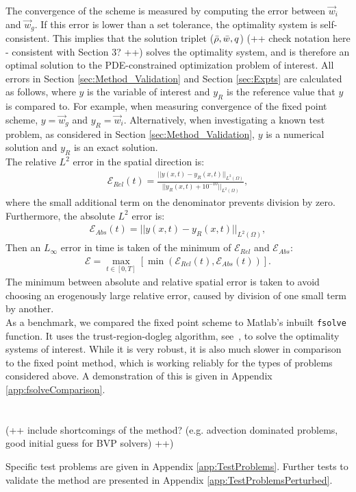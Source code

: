 The convergence of the scheme is measured by computing the error between $\vec{w}_{i}$ and $\vec{w}_{g}$. If this error is lower than a set tolerance, the optimality system is self-consistent. This implies that the solution triplet ($\bar{\rho},\bar{{w}},q$) (++ check notation here - consistent with Section 3? ++) solves the optimality system, and is therefore an optimal solution to the PDE-constrained optimization problem of interest.
All errors in Section \ref{sec:Method_Validation} and Section \ref{sec:Expts} are calculated as follows, where $y$ is the variable of interest and $y_R$ is the reference value that $y$ is compared to. For example, when measuring convergence of the fixed point scheme, $y = \vec{w}_g$ and $y_R = \vec{w}_i$. Alternatively, when investigating a known test problem, as considered in Section \ref{sec:Method_Validation}, $y$ is a numerical solution and $y_R$ is an exact solution.\\ 
The relative $L^2$ error in the spatial direction is:
\begin{align*}
\mathcal{E}_{Rel}(t) = \frac{|| y(x,t) - y_{R}(x,t)||_{L^2(\Omega)} }{||y_R(x,t) + 10^{-10}||_{L^2(\Omega)}},
\end{align*}
where the small additional term on the denominator prevents division by zero.
Furthermore, the absolute $L^2$ error is:
\begin{align*}
\mathcal{E}_{Abs}(t) = || y(x,t) - y_R(x,t)||_{L^2(\Omega)} ,
\end{align*}
Then an $L_\infty$ error in time is taken of the minimum of $\mathcal{E}_{Rel}$ and $\mathcal{E}_{Abs}$:
\begin{align*}
\mathcal{E} = \max_{t \in [0,T]}\left[\min\left(\mathcal{E}_{Rel}(t), \mathcal{E}_{Abs}(t)\right)\right].
\end{align*}
The minimum between absolute and relative spatial error is taken to avoid choosing an erogenously large relative error, caused by division of one small term by another.
\\
As a benchmark, we compared the fixed point scheme to Matlab's inbuilt \texttt{fsolve} function. It uses the trust-region-dogleg algorithm, see~\cite{Powell1}, to solve the optimality systems of interest. While it is very robust, it is also much slower in comparison to the fixed point method, which is working reliably for the types of problems considered above.
A demonstration of this is given in Appendix \ref{app:fsolveComparison}.
\\
\\
\\
(++ include shortcomings of the method? (e.g. advection dominated problems, good initial guess for BVP solvers) ++)


Specific test problems are given in Appendix \ref{app:TestProblems}. 
Further tests to validate the method are presented in Appendix \ref{app:TestProblemsPerturbed}.
